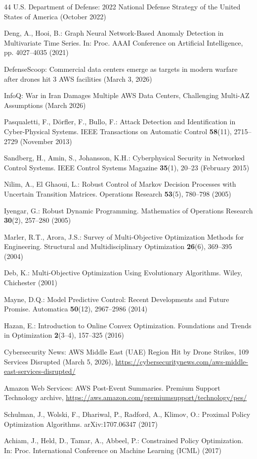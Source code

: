 \documentclass[runningheads]{llncs}
\begin{document}
\begin{thebibliography}{44}
 U.S. Department of Defense: 2022 National Defense Strategy of the United States of America (October 2022)

 Deng, A., Hooi, B.: Graph Neural Network-Based Anomaly Detection in Multivariate Time Series. In: Proc. AAAI Conference on Artificial Intelligence, pp. 4027--4035 (2021)

 DefenseScoop: Commercial data centers emerge as targets in modern warfare after drones hit 3 AWS facilities (March 3, 2026)

 InfoQ: War in Iran Damages Multiple AWS Data Centers, Challenging Multi-AZ Assumptions (March 2026)

 Pasqualetti, F., D\"{o}rfler, F., Bullo, F.: Attack Detection and Identification in Cyber-Physical Systems. IEEE Transactions on Automatic Control \textbf{58}(11), 2715--2729 (November 2013)

 Sandberg, H., Amin, S., Johansson, K.H.: Cyberphysical Security in Networked Control Systems. IEEE Control Systems Magazine \textbf{35}(1), 20--23 (February 2015)

 Nilim, A., El Ghaoui, L.: Robust Control of Markov Decision Processes with Uncertain Transition Matrices. Operations Research \textbf{53}(5), 780--798 (2005)

 Iyengar, G.: Robust Dynamic Programming. Mathematics of Operations Research \textbf{30}(2), 257--280 (2005)

 Marler, R.T., Arora, J.S.: Survey of Multi-Objective Optimization Methods for Engineering. Structural and Multidisciplinary Optimization \textbf{26}(6), 369--395 (2004)

 Deb, K.: Multi-Objective Optimization Using Evolutionary Algorithms. Wiley, Chichester (2001)

 Mayne, D.Q.: Model Predictive Control: Recent Developments and Future Promise. Automatica \textbf{50}(12), 2967--2986 (2014)

 Hazan, E.: Introduction to Online Convex Optimization. Foundations and Trends in Optimization \textbf{2}(3--4), 157--325 (2016)

 Cybersecurity News: AWS Middle East (UAE) Region Hit by Drone Strikes, 109 Services Disrupted (March 5, 2026), \url{https://cybersecuritynews.com/aws-middle-east-services-disrupted/}

 Amazon Web Services: AWS Post-Event Summaries. Premium Support Technology archive, \url{https://aws.amazon.com/premiumsupport/technology/pes/}

 Schulman, J., Wolski, F., Dhariwal, P., Radford, A., Klimov, O.: Proximal Policy Optimization Algorithms. arXiv:1707.06347 (2017)

 Achiam, J., Held, D., Tamar, A., Abbeel, P.: Constrained Policy Optimization. In: Proc. International Conference on Machine Learning (ICML) (2017)

\end{thebibliography}
\end{document}
